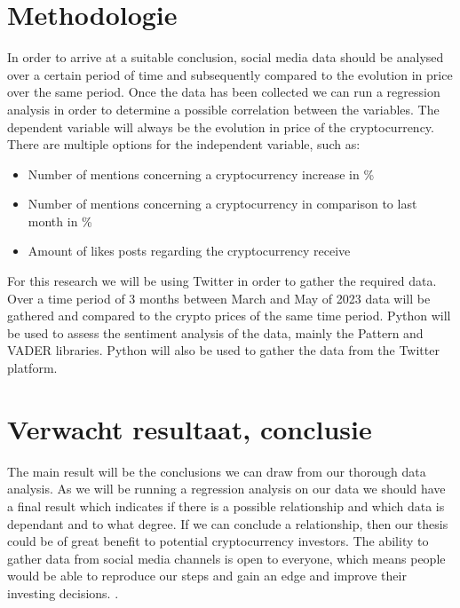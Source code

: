


\section{Methodologie}%
\label{sec:methodologie}


\noindent In order to arrive at a suitable conclusion, social media data should be analysed over a certain period of time and subsequently compared to the evolution in price over the same period. Once the data has been collected we can run a regression analysis in order to determine a possible correlation between the variables. The dependent variable will always be the evolution in price of the cryptocurrency. There are multiple options for the independent variable, such as:

\begin{itemize}
    \item Number of mentions concerning a cryptocurrency increase in \%
    
    \item Number of mentions concerning a cryptocurrency in comparison to last month in \%
    
    \item Amount of likes posts regarding the cryptocurrency receive 
    
\end{itemize}
\noindent For this research we will be using Twitter in order to gather the required data. Over a time period of 3 months between March and May of 2023 data will be gathered and compared to the crypto prices of the same time period. Python will be used to assess the sentiment analysis of the data, mainly the Pattern and VADER libraries. Python will also  be used to gather the data from the Twitter platform.


\section{Verwacht resultaat, conclusie}%
\label{sec:verwachte_resultaten}

\noindent The main result will be the conclusions we can draw from our thorough data analysis. As we will be running a regression analysis on our data we should have a final result which indicates if there is a possible relationship and which data is dependant and to what degree. If we can conclude a relationship, then our thesis could be of great benefit to potential cryptocurrency investors. The ability to gather data from social media channels is open to everyone, which means people would be able to reproduce our steps and gain an edge and improve their investing decisions. 
.

